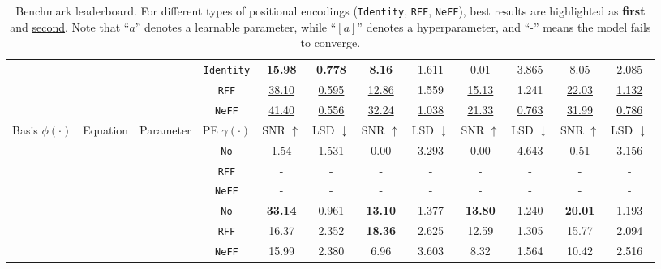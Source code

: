 \documentclass[letterpaper]{article} %
\newcommand{\fs}{\bf}   %
\begin{document}
\begin{table}[!ht]
\begin{tabular}{c|c|c|c|c|c|c|c|c|c|c|c}
        \hline
         &  & & \texttt{Identity} & \fs 15.98 & \fs 0.778 & \fs 8.16 & \underline{ 1.611} & 0.01 & 3.865 & \underline{ 8.05} &   2.085 \\
        & & & \texttt{RFF} & \underline{ 38.10} & \underline{ 0.595} & \underline{ 12.86} &  1.559 & \underline{ 15.13} &  1.241 & \underline{ 22.03} &  \underline{ 1.132} \\
        & & & \texttt{NeFF} & \underline{ 41.40} & \underline{ 0.556} & \underline{ 32.24} & \underline{ 1.038} & \underline{ 21.33} & \underline{ 0.763} & \underline{ 31.99} & \underline{ 0.786} \\

        \hline
        \hline
        Basis $\phi(\cdot)$ & Equation & Parameter & PE $\gamma(\cdot)$ & SNR $\uparrow$ & LSD $\downarrow$ & SNR $\uparrow$ & LSD $\downarrow$ & SNR $\uparrow$ & LSD $\downarrow$ & SNR $\uparrow$ & LSD $\downarrow$ \\
        
         & 
        &  & \texttt{No} & 1.54 & 1.531  & 0.00  & 3.293 & 0.00 & 4.643 & 0.51 & 3.156 \\
        & & & \texttt{RFF} & - & - & - & - & - & - & - & - \\
        & & & \texttt{NeFF} & - & - & - & - & - & - & - & -\\
        
         & 
        &  & \texttt{No} & \fs 33.14 & 0.961  & \fs 13.10  & 1.377 & \fs 13.80 & 1.240 & \fs 20.01 & 1.193 \\
        & & & \texttt{RFF} & 16.37 & 2.352 & \fs 18.36 & 2.625 & 12.59 & 1.305 &  15.77 & 2.094 \\
        & & & \texttt{NeFF} & 15.99 & 2.380 & 6.96 & 3.603 &  8.32 & 1.564 & 10.42 & 2.516 \\
         
    \end{tabular}
    \caption{Benchmark leaderboard. For different types of positional encodings (\texttt{Identity}, \texttt{RFF}, \texttt{NeFF}), best results are highlighted as  \textbf{first} and \underline{second}. Note that ``\(a\)'' denotes a learnable parameter, while ``\([a]\)'' denotes a hyperparameter, and ``-'' means the model fails to converge. }
    \label{tab:mlp_benchmark_appendix}
\end{table}
\end{document}
